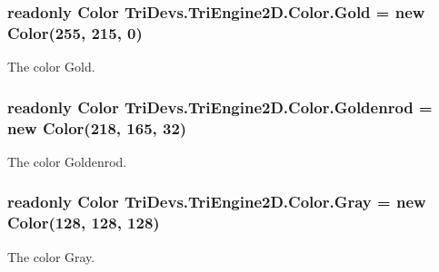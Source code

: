 \hypertarget{struct_tri_devs_1_1_tri_engine2_d_1_1_color_adc33680b407689a2d494b89efa3e5c39}{
\subsubsection[{Gold}]{\setlength{\rightskip}{0pt plus 5cm}readonly {\bf Color} Tri\-Devs.\-Tri\-Engine2\-D.\-Color.\-Gold = new {\bf Color}(255, 215, 0)\hspace{0.3cm}{\ttfamily [static]}}}\label{struct_tri_devs_1_1_tri_engine2_d_1_1_color_adc33680b407689a2d494b89efa3e5c39}


The color Gold. 

\hypertarget{struct_tri_devs_1_1_tri_engine2_d_1_1_color_aeecb848623d827652e9f90eddf78b04f}{
\subsubsection[{Goldenrod}]{\setlength{\rightskip}{0pt plus 5cm}readonly {\bf Color} Tri\-Devs.\-Tri\-Engine2\-D.\-Color.\-Goldenrod = new {\bf Color}(218, 165, 32)\hspace{0.3cm}{\ttfamily [static]}}}\label{struct_tri_devs_1_1_tri_engine2_d_1_1_color_aeecb848623d827652e9f90eddf78b04f}


The color Goldenrod. 

\hypertarget{struct_tri_devs_1_1_tri_engine2_d_1_1_color_a7ce9fe8d3f23c15a81e380b76daa0b7e}{
\subsubsection[{Gray}]{\setlength{\rightskip}{0pt plus 5cm}readonly {\bf Color} Tri\-Devs.\-Tri\-Engine2\-D.\-Color.\-Gray = new {\bf Color}(128, 128, 128)\hspace{0.3cm}{\ttfamily [static]}}}\label{struct_tri_devs_1_1_tri_engine2_d_1_1_color_a7ce9fe8d3f23c15a81e380b76daa0b7e}


The color Gray. 

